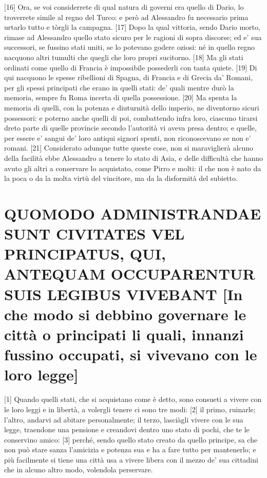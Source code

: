 {[}16{]} Ora, se voi considerrete di qual natura di governi era quello
di Dario, lo troverrete simile al regno del Turco: e però ad Alessandro
fu necessario prima urtarlo tutto e tòrgli la campagna. {[}17{]} Dopo la
qual vittoria, sendo Dario morto, rimase ad Alessandro quello stato
sicuro per le ragioni di sopra discorse; ed e' sua successori, se
fussino stati uniti, se lo potevano godere oziosi: né in quello regno
nacquono altri tumulti che quegli che loro propri sucitorno. {[}18{]} Ma
gli stati ordinati come quello di Francia è impossibile possederli con
tanta quiete. {[}19{]} Di qui nacquono le spesse ribellioni di Spagna,
di Francia e di Grecia da' Romani, per gli spessi principati che erano
in quelli stati: de' quali mentre durò la memoria, sempre fu Roma
incerta di quella possessione. {[}20{]} Ma spenta la memoria di quelli,
con la potenza e diuturnità dello imperio, ne diventorno sicuri
possessori: e poterno anche quelli di poi, combattendo infra loro,
ciascuno tirarsi dreto parte di quelle provincie secondo l'autorità vi
aveva presa dentro; e quelle, per essere e' sangui de' loro antiqui
signori spenti, non riconoscevano se non e' romani. {[}21{]} Considerato
adunque tutte queste cose, non si maraviglierà alcuno della facilità
ebbe Alessandro a tenere lo stato di Asia, e delle difficultà che hanno
avuto gli altri a conservare lo acquistato, come Pirro e molti: il che
non è nato da la poca o da la molta virtù del vincitore, ma da la
disformità del subietto.

\quebra\section{QUOMODO ADMINISTRANDAE SUNT CIVITATES VEL PRINCIPATUS, QUI, ANTEQUAM
OCCUPARENTUR SUIS LEGIBUS VIVEBANT\break
{[}In che modo si debbino governare le città o principati li quali,
innanzi fussino occupati, si vivevano con le loro legge{]}}

{[}1{]} Quando quelli stati, che si acquistano come è detto, sono
consueti a vivere con le loro leggi e in libertà, a volergli tenere ci
sono tre modi: {[}2{]} il primo, ruinarle; l'altro, andarvi ad abitare
personalmente; il terzo, lasciàgli vivere con le sua legge, traendone
una pensione e creandovi dentro uno stato di pochi, che te le conservino
amico: {[}3{]} perché, sendo quello stato creato da quello principe, sa
che non può stare sanza l'amicizia e potenza sua e ha a fare tutto per
mantenerlo; e più facilmente si tiene una città usa a vivere libera con
il mezzo de' sua cittadini che in alcuno altro modo, volendola
perservare.

